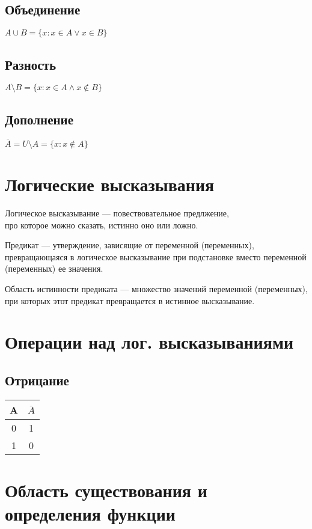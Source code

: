 \documentclass{article}
\begin{document}
\subsection{Объединение}

$A \cup B = \{x: x \in A \lor x \in B\}$

\subsection{Разность}

$A \setminus B = \{x: x \in A \land x \notin B\}$

\subsection{Дополнение}

$\overline{A} = U \setminus A = \{x: x \notin A\}$

\section{Логические высказывания}
Логическое высказывание --- повествовательное предлжение, \\
про которое можно сказать, истинно оно или ложно.

Предикат --- утверждение, зависящие от переменной (переменных),
превращающаяся в логическое высказывание при подстановке вместо переменной (переменных) ее значения.

Область истинности предиката --- множество значений переменной (переменных), \\
при которых этот предикат превращается в истинное высказывание.

\section{Операции над лог. высказываниями}

\subsection{Отрицание}
\begin{tabular}{c|c}
	A & $\overline{A}$ \\
	\hline
	0 & 1 \\
	1 & 0
\end{tabular}

\section{Область существования и \\
определения функции}
\end{document}
